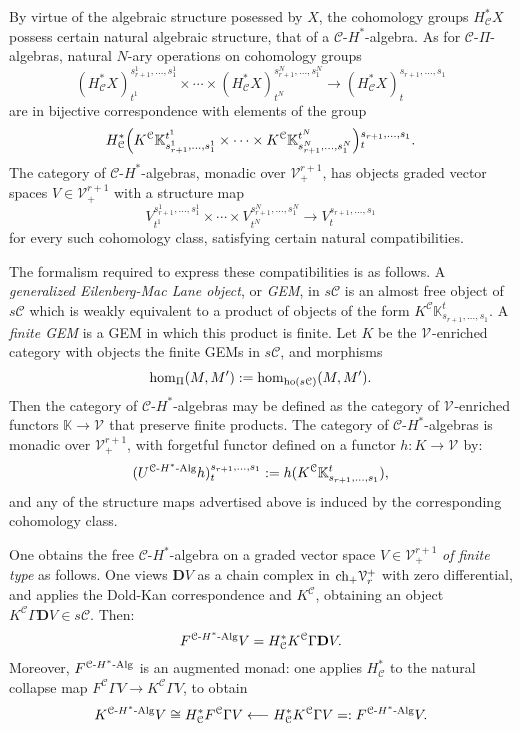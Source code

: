 \documentclass[11pt]{amsart}
\theoremstyle{plain}
\theoremstyle{definition}
\renewcommand{\to}{\longrightarrow}
\newcommand{\from}{\longleftarrow}
\newcommand{\calV}{\mathcal{V}}
\newcommand{\calc}{\mathcal{C}}
\theoremstyle{plain}
\newcommand{\vect}[2]{\calV^{#1}_{#2}}
\newcommand{\HAlg}{\textup{-$H^*$-Alg}}
\newcommand{\complexes}{\textup{ch}_+}
\newcommand{\dual}{\mathbf{D}}
\begin{document}
\begin{CPiAlgs and CHalgs}
By virtue of the algebraic structure posessed by $X$, the cohomology groups $H_\calc^*X$ possess certain natural algebraic structure, that of a $\calc$-$H^*$-algebra.  As for $\calc$-$\Pi$-algebras, natural $N$-ary operations on cohomology groups
\[(H^*_\calc X)^{s_{r+1}^{1},\ldots,s_{1}^{1}}_{t^1}\times\cdots \times(H^*_\calc X)^{s_{r+1}^{N},\ldots,s_{1}^{N}}_{t^N}\to (H^*_\calc X)^{s_{r+1},\ldots,s_{1}}_{t}\]
are in bijective correspondence with elements of the group
\[ H^*_\calc\Bigl(K^\calc\mathbb{K}_{s_{r+1}^{1},\ldots,s_{1}^{1}}^{t^1}\times\cdots\times K^\calc\mathbb{K}_{s_{r+1}^{N},\ldots,s_{1}^{N}}^{t^N}\Bigr)\makebox[0cm][l]{}^{s_{r+1},\ldots,s_{1}}_{t}.\]
The category of $\calc$-$H^*$-algebras, monadic over $\vect{r+1}{+}$, has objects graded vector spaces $V\in\vect{r+1}{+}$ with a structure map 
\[V^{s_{r+1}^{1},\ldots,s_{1}^{1}}_{t^1}\times\cdots \times V^{s_{r+1}^{N},\ldots,s_{1}^{N}}_{t^N}\to V^{s_{r+1},\ldots,s_{1}}_{t}\]
for every such cohomology class, satisfying certain natural compatibilities.

The formalism required to express these compatibilities is as follows. A \emph{generalized Eilenberg-Mac Lane object}, or \emph{GEM}, in $s\calc$ is an almost free object of $s\calc$ which is weakly equivalent to a product of objects of the form $K^\calc\mathbb{K}_{s_{r+1},\ldots,s_{1}}^{t}$. A \emph{finite GEM} is a GEM in which this product is finite. Let $K$  be the $\vect{}{}$-enriched category with objects the finite GEMs in $s\calc$, and morphisms
\[\hom_{\Pi}(M,M'):=\hom_{\textup{ho}(s\calc)}(M,M').\]
Then the category of $\calc$-$H^*$-algebras  may be defined as the category of $\vect{}{}$-enriched functors $\mathbb{K}\to \vect{}{}$ that preserve finite products. The category of $\calc$-$H^*$-algebras is monadic over $\vect{r+1}{+}$, with forgetful functor defined  on a functor $h:K\to \vect{}{}$  by:%
\[(U^{\calc\HAlg}h)_t^{s_{r+1},\ldots,s_1}:=h(K^\calc\mathbb{K}_{s_{r+1},\ldots,s_{1}}^{t}),\]
and any of the structure maps advertised above is induced by the corresponding cohomology class. %

One obtains the free $\calc$-$H^*$-algebra on a graded vector space $V\in \vect{r+1}{+}$ \emph{of finite type} as follows. One views $\dual V$ as a chain complex in $\complexes\vect{+}{r}$ with zero differential, and applies the Dold-Kan correspondence and $K^\calc$, obtaining an object $K^\calc\Gamma \dual V\in s\calc$. Then:
\[F^{\calc\HAlg}V=H^*_{\calc}K^\calc\Gamma\dual V.\]
Moreover, $F^{\calc\HAlg}$ is an augmented monad: one applies $H^*_{\calc}$ to the natural collapse map $F^{\calc}\Gamma V\to K^{\calc}\Gamma V$, to obtain
\[K^{\calc\HAlg}V\cong H^*_{\calc} F^{\calc}\Gamma V\from H^*_{\calc} K^{\calc}\Gamma V=:F^{\calc\HAlg}V.\]


\end{CPiAlgs and CHalgs}
\end{document}
